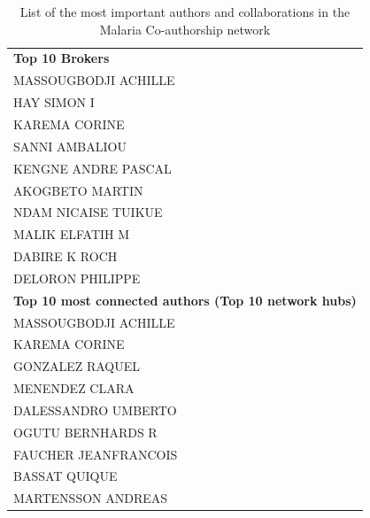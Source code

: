 \begin{table}[!ht]
\caption{List of the most important authors and collaborations in the Malaria Co-authorship network}
\label{table: malaria_list}
\centering \scriptsize
\begin{tabular}{l}
  \toprule
\textbf{Top 10 Brokers}\\
\hspace{20pt}MASSOUGBODJI ACHILLE\\
\hspace{20pt}HAY SIMON I\\
\hspace{20pt}KAREMA CORINE\\
\hspace{20pt}SANNI AMBALIOU\\
\hspace{20pt}KENGNE ANDRE PASCAL\\
\hspace{20pt}AKOGBETO MARTIN\\
\hspace{20pt}NDAM NICAISE TUIKUE\\
\hspace{20pt}MALIK ELFATIH M\\
\hspace{20pt}DABIRE K ROCH\\
\hspace{20pt}DELORON PHILIPPE\\
\hline
\textbf{Top 10 most connected authors (Top 10 network hubs)}\\
\hspace{20pt}MASSOUGBODJI ACHILLE\\
\hspace{20pt}KAREMA CORINE\\
\hspace{20pt}GONZALEZ RAQUEL\\
\hspace{20pt}MENENDEZ CLARA\\
\hspace{20pt}DALESSANDRO UMBERTO\\
\hspace{20pt}OGUTU BERNHARDS R\\
\hspace{20pt}FAUCHER JEANFRANCOIS\\
\hspace{20pt}BASSAT QUIQUE\\
\hspace{20pt}MARTENSSON ANDREAS\\

\end{tabular}
\end{table}
